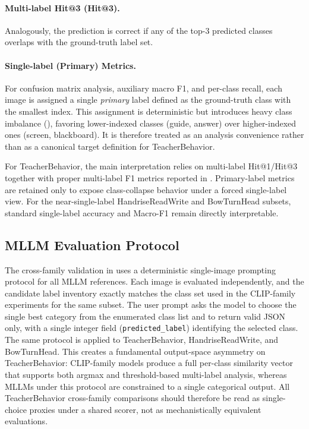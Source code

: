 \documentclass[electronics,article,submit,pdftex,moreauthors]{Definitions/mdpi}
\begin{document}
\paragraph{Multi-label Hit@3 (Hit@3).}
Analogously, the prediction is correct if any of the top-3 predicted classes overlaps with the ground-truth label set.

\paragraph{Single-label (Primary) Metrics.}
For confusion matrix analysis, auxiliary macro F1, and per-class recall, each image is assigned a single \emph{primary} label defined as the ground-truth class with the smallest index.
This assignment is deterministic but introduces heavy class imbalance (), favoring lower-indexed classes (guide, answer) over higher-indexed ones (screen, blackboard). It is therefore treated as an analysis convenience rather than as a canonical target definition for TeacherBehavior.

For TeacherBehavior, the main interpretation relies on multi-label Hit@1/Hit@3 together with proper multi-label F1 metrics reported in . Primary-label metrics are retained only to expose class-collapse behavior under a forced single-label view. For the near-single-label HandriseReadWrite and BowTurnHead subsets, standard single-label accuracy and Macro-F1 remain directly interpretable.

\subsection{MLLM Evaluation Protocol}
\label{sec:mllm_protocol}

The cross-family validation in  uses a deterministic single-image prompting protocol for all MLLM references. Each image is evaluated independently, and the candidate label inventory exactly matches the class set used in the CLIP-family experiments for the same subset. The user prompt asks the model to choose the single best category from the enumerated class list and to return valid JSON only, with a single integer field (\texttt{predicted\_label}) identifying the selected class. The same protocol is applied to TeacherBehavior, HandriseReadWrite, and BowTurnHead. This creates a fundamental output-space asymmetry on TeacherBehavior: CLIP-family models produce a full per-class similarity vector that supports both argmax and threshold-based multi-label analysis, whereas MLLMs under this protocol are constrained to a single categorical output. All TeacherBehavior cross-family comparisons should therefore be read as single-choice proxies under a shared scorer, not as mechanistically equivalent evaluations.
\end{document}
